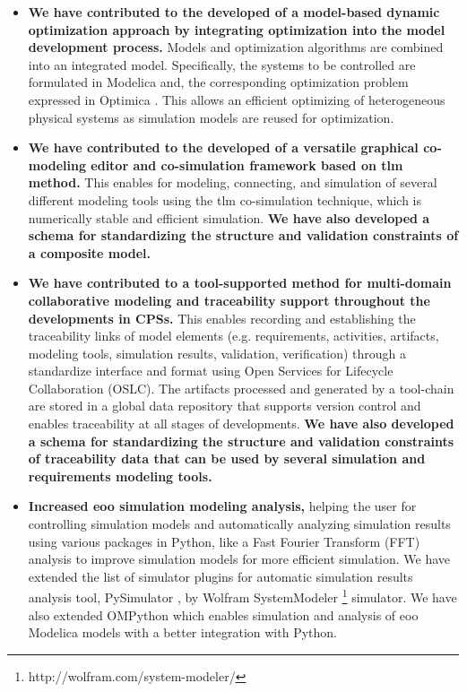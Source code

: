 \begin{itemize}
	
\item \textbf{We have contributed to the  developed of a model-based dynamic optimization approach by integrating optimization into the model development process.} Models and optimization algorithms are combined into an integrated model. Specifically, the systems to be controlled are formulated in Modelica and, the corresponding optimization problem expressed in Optimica \cite{optimica}. This allows an efficient optimizing of heterogeneous physical systems as simulation models are reused for optimization.

\item \textbf{We have contributed to the  developed of a versatile graphical co-modeling editor and co-simulation framework based on \acrshort{tlm} method.} This enables for modeling, connecting, and simulation of several different modeling tools using the \acrshort{tlm} co-simulation technique, which is numerically stable and efficient simulation. \textbf{We have also developed a schema for standardizing the structure and validation constraints of a composite model.} 

\item \textbf{We have contributed to a tool-supported method for multi-domain collaborative modeling and traceability support throughout the developments in CPSs.} This enables recording and establishing the traceability links of model elements (e.g. requirements, activities, artifacts, modeling tools, simulation results, validation, verification) through a standardize interface and format using Open Services for Lifecycle Collaboration (OSLC). The artifacts processed and generated by a tool-chain are stored in a global data repository that supports version control and enables traceability at all stages of developments.\textbf{ We have also developed a schema for standardizing the structure and validation constraints of traceability data that can be used by several simulation and requirements modeling tools.} 

\item \textbf{Increased \acrshort{eoo} simulation modeling analysis,} helping the user for controlling simulation models and automatically analyzing simulation results using various packages in Python, like a Fast Fourier Transform (FFT) analysis to improve simulation models for more efficient simulation. We have extended the list of simulator plugins for automatic simulation results analysis tool, PySimulator \cite{pysimulator}, by Wolfram SystemModeler \footnote{http://wolfram.com/system-modeler/} simulator. We have also extended OMPython \cite{ompython} which enables simulation and analysis of \acrshort{eoo} Modelica models with a better integration with Python.

\end{itemize}


